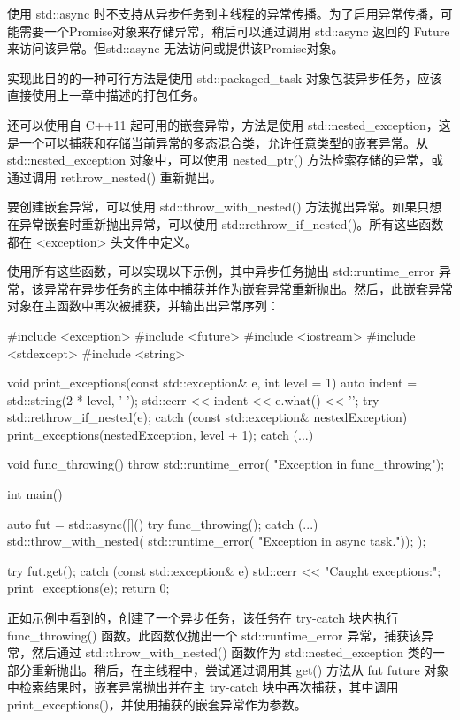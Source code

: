 
使用 std::async 时不支持从异步任务到主线程的异常传播。为了启用异常传播，可能需要一个Promise对象来存储异常，稍后可以通过调用 std::async 返回的 Future 来访问该异常。但std::async 无法访问或提供该Promise对象。

实现此目的的一种可行方法是使用 std::packaged\_task 对象包装异步任务，应该直接使用上一章中描述的打包任务。

还可以使用自 C++11 起可用的嵌套异常，方法是使用 std::nested\_exception，这是一个可以捕获和存储当前异常的多态混合类，允许任意类型的嵌套异常。从 std::nested\_exception 对象中，可以使用 nested\_ptr() 方法检索存储的异常，或通过调用 rethrow\_nested() 重新抛出。

要创建嵌套异常，可以使用 std::throw\_with\_nested() 方法抛出异常。如果只想在异常嵌套时重新抛出异常，可以使用 std::rethrow\_if\_nested()。所有这些函数都在 <exception> 头文件中定义。

使用所有这些函数，可以实现以下示例，其中异步任务抛出 std::runtime\_error 异常，该异常在异步任务的主体中捕获并作为嵌套异常重新抛出。然后，此嵌套异常对象在主函数中再次被捕获，并输出出异常序列：

\begin{cpp}
#include <exception>
#include <future>
#include <iostream>
#include <stdexcept>
#include <string>

void print_exceptions(const std::exception& e,
                      int level = 1) {
    auto indent = std::string(2 * level, ' ');
    std::cerr << indent << e.what() << '\n';
    try {
        std::rethrow_if_nested(e);
    } catch (const std::exception& nestedException) {
        print_exceptions(nestedException, level + 1);
    } catch (...) { }
}

void func_throwing() {
    throw std::runtime_error(
    "Exception in func_throwing");
}

int main() {
    auto fut = std::async([]() {
        try {
            func_throwing();
        } catch (...) {
            std::throw_with_nested(
                std::runtime_error(
                    "Exception in async task."));
        }
    });

    try {
        fut.get();
    } catch (const std::exception& e) {
        std::cerr << "Caught exceptions:\n";
        print_exceptions(e);
    }
    return 0;
}
\end{cpp}

正如示例中看到的，创建了一个异步任务，该任务在 try-catch 块内执行 func\_throwing() 函数。此函数仅抛出一个 std::runtime\_error 异常，捕获该异常，然后通过 std::throw\_with\_nested() 函数作为 std::nested\_exception 类的一部分重新抛出。稍后，在主线程中，尝试通过调用其 get() 方法从 fut future 对象中检索结果时，嵌套异常抛出并在主 try-catch 块中再次捕获，其中调用 print\_exceptions()，并使用捕获的嵌套异常作为参数。

